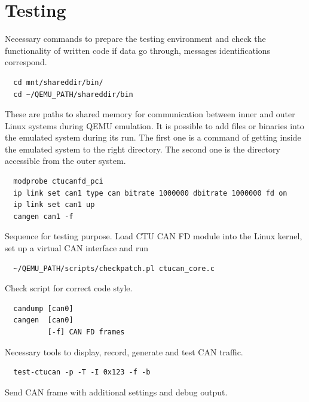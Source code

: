 \documentclass{ctuthesis}
\begin{document}
\chapter{Testing}
 Necessary commands to prepare the testing environment and check the functionality of written code if data go through, messages identifications correspond.
 \begin{verbatim}  cd mnt/shareddir/bin/
  cd ~/QEMU_PATH/shareddir/bin\end{verbatim}
 These are paths to shared memory for communication between inner and outer Linux systems during QEMU emulation. It is possible to add files or binaries into the emulated system during its run. The first one is a command of getting inside the emulated system to the right directory. The second one is the directory accessible from the outer system.
 \begin{verbatim}  modprobe ctucanfd_pci
  ip link set can1 type can bitrate 1000000 dbitrate 1000000 fd on
  ip link set can1 up
  cangen can1 -f\end{verbatim}
 Sequence for testing purpose. Load CTU CAN FD module into the Linux kernel, set up a virtual CAN interface and run
 \begin{verbatim}  ~/QEMU_PATH/scripts/checkpatch.pl ctucan_core.c\end{verbatim}
 Check script for correct code style.
 \begin{verbatim}  candump [can0]
  cangen  [can0]
          [-f] CAN FD frames\end{verbatim}
 Necessary tools to display, record, generate and test CAN traffic. \cite{can-utils}
 \begin{verbatim}  test-ctucan -p -T -I 0x123 -f -b\end{verbatim}
 Send CAN frame with additional settings and debug output.
\end{document}
